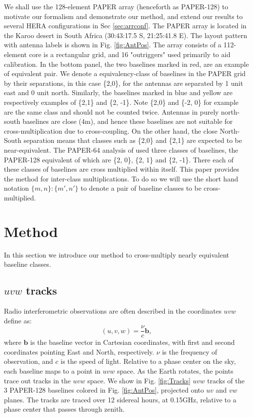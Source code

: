 \documentclass[twocolumn,apj,numberedappendix]{emulateapj}
\renewcommand\[{\begin{equation}}
\renewcommand\]{\end{equation}}
\begin{document}
We shall use the 128-element PAPER array (henceforth as PAPER-128) to motivate our formalism and demonstrate our method, and extend our results to several HERA configurations in Sec \ref{sec:arrconf}. 
The PAPER array is located in the Karoo desert in South Africa (30:43:17.5
S, 21:25:41.8 E). The layout pattern with antenna labels is shown
in Fig. \ref{fig:AntPos}. The array consists of a 112-element core is a rectangular grid, and 16 "outriggers" used primarily to aid calibration.  In the bottom panel, the two baselines marked in red, are an example of equivalent pair. We denote a equivalency-class of baselines in the PAPER grid by their separations, in this case  \{2,0\}, for the
antennas are separated by 1 unit east and 0 unit north. Similarly,
the baselines marked in blue and yellow are respectively examples
of \{2,1\} and \{2, -1\}.
Note \{2,0\} and \{-2, 0\} for example are the same class and should
not be counted twice. Antennas in purely north-south baselines
are close (4m), and hence these baselines are not suitable
for cross-multiplication due to cross-coupling. On the other hand, the close North-South separation means that classes such as \{2,0\} and  \{2,1\} are expected to be near-equivalent. The PAPER-64 analysis of \cite{Ali2015} used three classes of baselines, the PAPER-128
equivalent of which are 
\{2, 0\}, \{2, 1\} and \{2, -1\}. There each of these classes
of baselines are cross multiplied within itself. This paper provides the method for inter-class multiplications. To do so we will use the short hand notation $\{m,n\}:\{m',n'\}$ to denote a pair of baseline classes to be cross-multiplied. 


\section{Method \label{sec:method}}\label{sec:method}

In this section we introduce our method to cross-multiply nearly equivalent baseline classes. 

\subsection{$uvw$ tracks \label{sec:tracks}}


Radio interferometric observations are often described in the coordinates $uvw$ define as:
\[
(u, v, w) = \frac{\nu}{c}\boldsymbol{b}, 
\]
where $\boldsymbol{b}$ is the baseline vector in Cartesian coordinates, with first and second coordinates pointing East and North, respectively.  $\nu$ is the frequency of observation, and $c$ is the speed of light. 
Relative to a phase center on the sky, each baseline maps to a point in $uvw$ space. As the Earth rotates, the points trace out tracks in the $uvw$ space. 
We show in Fig. \ref{fig:Tracks} $uvw$ tracks of the 3 PAPER-128 baselines colored in Fig. \ref{fig:AntPos}, projected onto $uv$ and $vw$ planes. The tracks are traced over 12 sidereal hours, at 0.15GHz, relative to a phase center that passes through zenith. 
\end{document}
